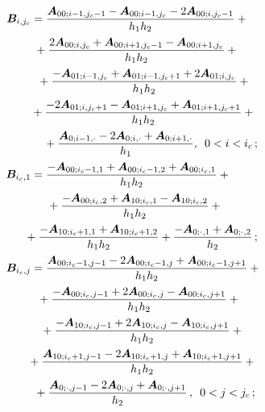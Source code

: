 \begin{multicols}{2}
\begin{align*}
  \bm{B}_{i,j_c}&=\fr{\bm{A}_{00;i-1,j_c-1} - \bm{A}_{00;i-1,j_c} - 2\bm{A}_{00;i,j_c-1}}{h_1h_2} +{} \\
 &\hspace*{1mm}{}+\fr{2\bm{A}_{00;i,j_c} + \bm{A}_{00;i+1,j_c-1} - \bm{A}_{00;i+1,j_c}}{h_1h_2}+{}\\
 &\hspace*{2mm}{}+ \fr{ -\bm{A}_{01;i-1,j_c} + \bm{A}_{01;i-1,j_c+1} + 2\bm{A}_{01;i,j_c}}{h_1h_2}+{}\\
& {}+\fr{ - 2\bm{A}_{01;i,j_c+1} - \bm{A}_{01;i+1,j_c} + \bm{A}_{01;i+1,j_c+1}}{h_1h_2} +{}\\
&\hspace*{4mm}{}+ \fr{\bm{A}_{0;i-1,\cdot} - 2\bm{A}_{0;i,\cdot} + \bm{A}_{0;i+1,\cdot}}{h_1},\enskip    0<i<i_c\,; \\
  \bm{B}_{i_c,1}&=\fr{-\bm{A}_{00;i_c-1,1} + \bm{A}_{00;i_c-1,2} + \bm{A}_{00;i_c,1}}{h_1h_2}+{}\\
  &\hspace*{5mm}{}+ \fr{ -\bm{A}_{00; i_c,2} + \bm{A}_{10;i_c,1} - \bm{A}_{10;i_c,2}}{h_1 h_2}+{}\\
  &\hspace*{-2mm}{}+\fr{ - \bm{A}_{10;i_c+1,1} +\bm{A}_{10;i_c+1,2}}{h_1h_2} +   \fr{- \bm{A}_{0;\cdot,1} + \bm{A}_{0;\cdot,2}}{h_2}\,; \\
   \bm{B}_{i_c,j}&=\fr{\bm{A}_{00;i_c-1,j-1} - 2\bm{A}_{00;i_c-1,j} + \bm{A}_{00;i_c-1,j+1}}{h_1h_2} + {}\\
   &\hspace*{2mm}{}+   \fr{-\bm{A}_{00;i_c,j-1} + 2\bm{A}_{00;i_c,j} - \bm{A}_{00;i_c,j+1}}{h_1h_2}+{}\\
   &\hspace*{3mm}{}+ \fr{ - \bm{A}_{10;i_c,j-1} + 2\bm{A}_{10;i_c,j} - \bm{A}_{10;i_c,j+1}}{h_1h_2} +{}\\
  &\hspace*{-1mm} {}+\fr{ \bm{A}_{10;i_c+1,j-1} - 2\bm{A}_{10;i_c+1,j} + \bm{A}_{10;i_c+1,j+1}}{h_1h_2} +{}\\
&\hspace*{1mm}{}+ \fr{\bm{A}_{0;\cdot,j-1} - 2\bm{A}_{0;\cdot,j} + \bm{A}_{0;\cdot,j+1}}{h_2}\,,\enskip    0<j<j_c\,; 
 \end{align*}
  

\end{multicols}
